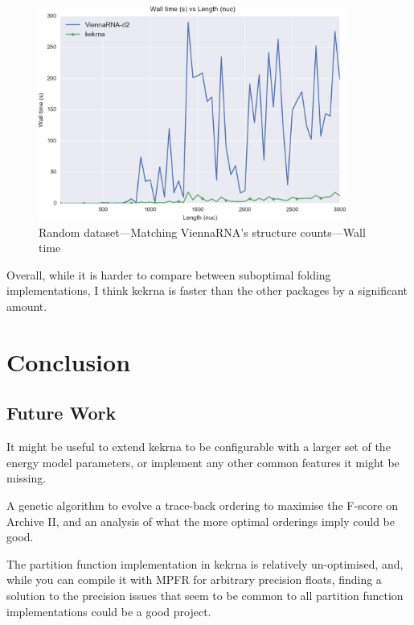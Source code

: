 \documentclass{cshonours}
\begin{document}
\begin{figure}[p]
\centering
\includegraphics[width=0.9\textwidth]{res/subopt_max_real.png}
\caption{Random dataset---Matching ViennaRNA's structure counts---Wall time}
\label{fig:subopt_max_real}
\end{figure}

Overall, while it is harder to compare between suboptimal folding implementations, I think kekrna is faster than the other packages by a significant amount.

\chapter{Conclusion}
\section{Future Work}
It might be useful to extend kekrna to be configurable with a larger set of the energy model parameters, or implement any other common features it might be missing. 

A genetic algorithm to evolve a trace-back ordering to maximise the F-score on Archive II, and an analysis of what the more optimal orderings imply could be good. 

The partition function implementation in kekrna is relatively un-optimised, and, while you can compile it with MPFR \cite{mpfr} for arbitrary precision floats, finding a solution to the precision issues that seem to be common to all partition function implementations could be a good project.
\end{document}
